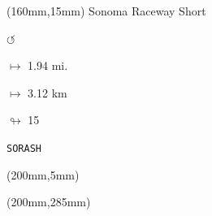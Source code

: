 \begin{textblock*}{40mm}(160mm,15mm)%
Sonoma Raceway Short
\par \Huge$\circlearrowleft$
\Large
\par$\mapsto$ 1.94 mi.
\par$\mapsto$ 3.12 km
\par$\looparrowright$ 15
\par\hfill\tiny\tt SORASH\\
\end{textblock*}
\begin{textblock*}{20mm}(200mm,5mm)%
\fbox{\thepage}
\end{textblock*}
\begin{textblock*}{20mm}(200mm,285mm)%
\fbox{\thepage}
\end{textblock*}
\null\newpage

